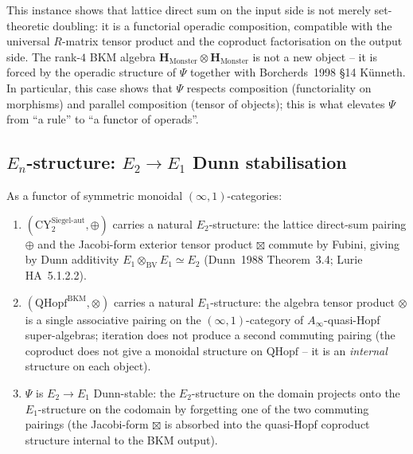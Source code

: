 \begin{remark}
\label{rem:phiutp-rank-doubling}
This instance shows that lattice direct sum on the input side is
not merely set-theoretic doubling: it is a functorial operadic
composition, compatible with the universal $R$-matrix tensor product
and the coproduct factorisation on the output side. The rank-$4$
BKM algebra $\mathbf{H}_{\mathrm{Monster}} \otimes \mathbf{H}_{\mathrm{Monster}}$
is not a new object -- it is forced by the operadic structure of $\Psi$
together with Borcherds~1998 \S14 K\"unneth. In particular, this
case shows that $\Psi$ respects composition (functoriality on
morphisms) and parallel composition (tensor of objects); this is
what elevates $\Psi$ from ``a rule'' to ``a functor of operads''.
\end{remark}

\subsection{\texorpdfstring{$E_n$}{E-n}-structure: \texorpdfstring{$E_2 \to E_1$}{E-2 -> E-1} Dunn stabilisation}
\label{subsec:phiutp-en-structure}

\begin{theorem}
\label{thm:phiutp-e2-to-e1-dunn}
As a functor of symmetric monoidal $(\infty,1)$-categories:
\begin{enumerate}[label=\textup{(\roman*)}]
 \item $(\mathrm{CY}^{\mathrm{Siegel\text{-}aut}}_2, \oplus)$
 carries a natural $E_2$-structure: the lattice direct-sum
 pairing $\oplus$ and the Jacobi-form exterior tensor product
 $\boxtimes$ commute by Fubini, giving by Dunn additivity
 $E_1 \otimes_{\mathrm{BV}} E_1 \simeq E_2$
 \textup{(}Dunn~1988 Theorem~3.4; Lurie HA~5.1.2.2\textup{).}
 \item $(\mathrm{QHopf}^{\mathrm{BKM}}, \otimes)$ carries a natural
 $E_1$-structure: the algebra tensor product $\otimes$ is a
 single associative pairing on the $(\infty,1)$-category of
 $A_\infty$-quasi-Hopf super-algebras; iteration does not
 produce a second commuting pairing (the coproduct does not give
 a monoidal structure on $\mathrm{QHopf}$ -- it is an
 \emph{internal} structure on each object).
 \item $\Psi$ is $E_2 \to E_1$ Dunn-stable: the $E_2$-structure on the
 domain projects onto the $E_1$-structure on the codomain by
 forgetting one of the two commuting pairings (the
 Jacobi-form $\boxtimes$ is absorbed into the quasi-Hopf
 coproduct structure internal to the BKM output).
\end{enumerate}
\end{theorem}

